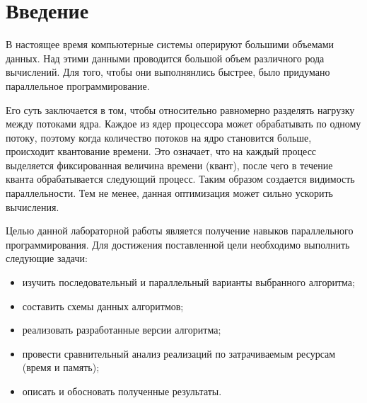 \chapter*{Введение}

В настоящее время компьютерные системы оперируют большими объемами данных. Над этими данными проводится большой объем различного рода вычислений. Для того, чтобы они выполнянлись быстрее, было придумано параллельное программирование.

Его суть заключается в том, чтобы относительно равномерно разделять нагрузку между потоками ядра. Каждое из ядер процессора может обрабатывать по одному потоку, поэтому когда количество потоков на ядро становится больше, происходит квантование времени. Это означает, что на каждый процесс выделяется фиксированная величина времени (квант), после чего в течение кванта обрабатывается следующий процесс. Таким образом создается видимость параллельности. Тем не менее, данная оптимизация может сильно ускорить вычисления. 

Целью данной лабораторной работы является получение навыков параллельного программирования. Для достижения поставленной цели необходимо выполнить следующие задачи:
\begin{itemize}
	\item изучить последовательный и параллельный варианты выбранного алгоритма;
	\item составить схемы данных алгоритмов;
	\item реализовать разработанные версии алгоритма;
	\item провести сравнительный анализ реализаций по затрачиваемым ресурсам (время и память);
	\item описать и обосновать полученные результаты.
\end{itemize}
